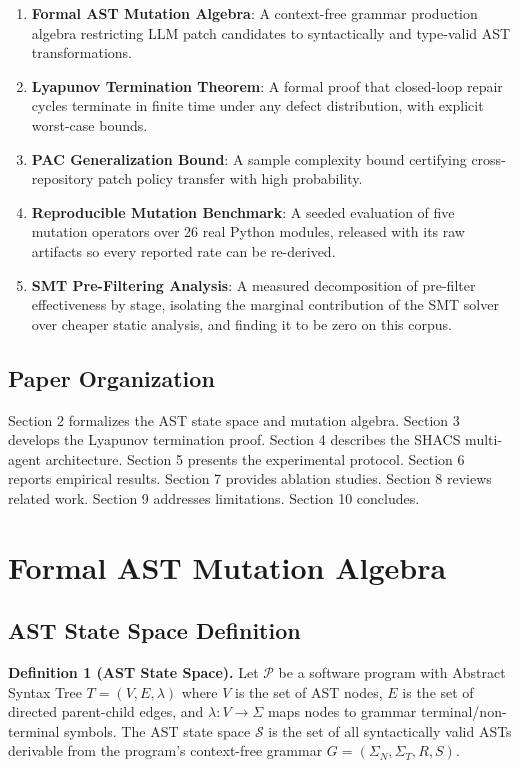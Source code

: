 \documentclass[10pt,journal,compsoc,twocolumn]{IEEEtran}
\begin{document}
\begin{enumerate}
  \item \textbf{Formal AST Mutation Algebra}: A context-free grammar production algebra restricting LLM patch candidates to syntactically and type-valid AST transformations.
  \item \textbf{Lyapunov Termination Theorem}: A formal proof that closed-loop repair cycles terminate in finite time under any defect distribution, with explicit worst-case bounds.
  \item \textbf{PAC Generalization Bound}: A sample complexity bound certifying cross-repository patch policy transfer with high probability.
  \item \textbf{Reproducible Mutation Benchmark}: A seeded evaluation of five mutation operators over 26 real Python modules, released with its raw artifacts so every reported rate can be re-derived.
  \item \textbf{SMT Pre-Filtering Analysis}: A measured decomposition of pre-filter effectiveness by stage, isolating the marginal contribution of the SMT solver over cheaper static analysis, and finding it to be zero on this corpus.
\end{enumerate}


\subsection{Paper Organization}


Section 2 formalizes the AST state space and mutation algebra. Section 3 develops the Lyapunov termination proof. Section 4 describes the SHACS multi-agent architecture. Section 5 presents the experimental protocol. Section 6 reports empirical results. Section 7 provides ablation studies. Section 8 reviews related work. Section 9 addresses limitations. Section 10 concludes.




\section{Formal AST Mutation Algebra}



\subsection{AST State Space Definition}


\textbf{Definition 1 (AST State Space).} Let $\mathcal{P}$ be a software program with Abstract Syntax Tree $T = (V, E, \lambda)$ where $V$ is the set of AST nodes, $E$ is the set of directed parent-child edges, and $\lambda: V \rightarrow \Sigma$ maps nodes to grammar terminal/non-terminal symbols. The AST state space $\mathcal{S}$ is the set of all syntactically valid ASTs derivable from the program's context-free grammar $G = (\Sigma_N, \Sigma_T, R, S)$.
\end{document}
